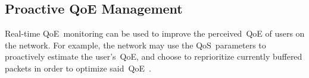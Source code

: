     \subsection{Proactive QoE Management}\label{introduction:applications:management}
        Real-time QoE~monitoring can be used to improve the perceived~QoE of users on the network. For example, the network may use the QoS~parameters to proactively estimate the user's~QoE, and choose to reprioritize currently buffered packets in order to optimize said~QoE~\autocite{DinakiHosseinEbrahimi2021FVQW}.
